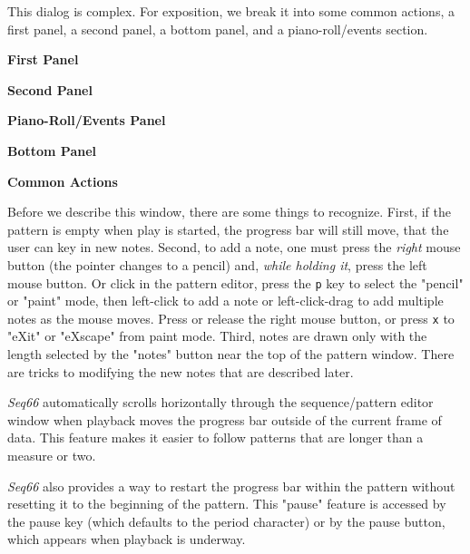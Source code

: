    This dialog is complex.
   For exposition, we break it into some common actions, a first panel, a
   second panel, a bottom panel, and a piano-roll/events section.

   \begin{enumber}
      \item \textbf{First Panel}
      \item \textbf{Second Panel}
      \item \textbf{Piano-Roll/Events Panel}
      \item \textbf{Bottom Panel}
      \item \textbf{Common Actions}
   \end{enumber}

   Before we describe this window, there are some things to recognize.
   First, if the pattern is empty when play is started, the progress bar will
   still move, that the user can key in new notes.
   Second, to add a note, one must press the \textsl{right}
   mouse button (the pointer changes to a pencil) and,
   \textsl{while holding it}, press the left mouse button.
   Or click in the pattern editor, press the
   \texttt{p} key to select the "pencil" or "paint" mode, then
   left-click to add a note or
   left-click-drag to add multiple notes as the mouse moves.
   Press or release the right mouse button, or press
   \texttt{x} to "eXit" or "eXscape" from paint mode.
   Third, notes are drawn only with the length selected by the "notes" button
   near the top of the pattern window.  There are tricks to
   modifying the new notes that are described later.

   \textsl{Seq66} automatically scrolls
   horizontally through the sequence/pattern editor window when
   playback moves the progress bar outside of the current frame of data.  This
   feature makes it easier to follow patterns that are longer than a measure or
   two.
   
   \textsl{Seq66} also provides a way to restart the progress
   bar within the pattern without resetting it to the beginning of the pattern.
   This "pause" feature is accessed by the
   pause key (which defaults to the period character) or by the pause
   button, which appears when playback is underway.

